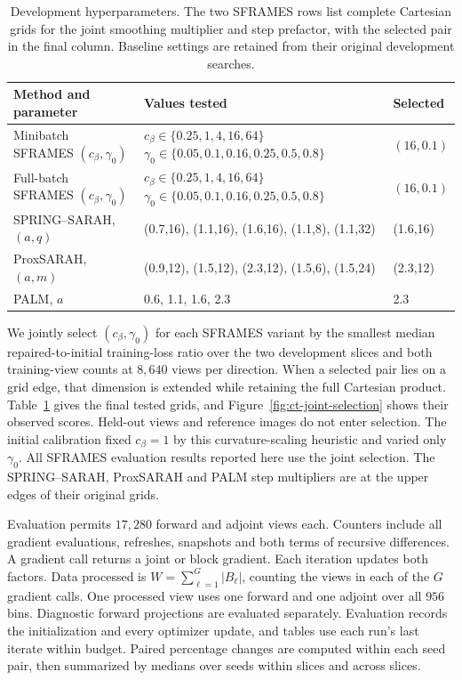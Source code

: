 \begin{table}[!htbp]
\centering
\caption{Development hyperparameters. The two SFRAMES rows list complete Cartesian grids for the joint smoothing multiplier and step prefactor, with the selected pair in the final column. Baseline settings are retained from their original development searches.}
\label{tab:ct-settings}
\small
\setlength{\tabcolsep}{4pt}
\begin{tabular}{@{}lll@{}}
\toprule
Method and parameter & Values tested & Selected \\
\midrule
\shortstack[l]{Minibatch SFRAMES\\ $(c_\beta,\gamma_0)$} & \shortstack[l]{$c_\beta\in\{0.25, 1, 4, 16, 64\}$\\ $\gamma_0\in\{0.05, 0.1, 0.16, 0.25, 0.5, 0.8\}$} & $(16,0.1)$ \\
\shortstack[l]{Full-batch SFRAMES\\ $(c_\beta,\gamma_0)$} & \shortstack[l]{$c_\beta\in\{0.25, 1, 4, 16, 64\}$\\ $\gamma_0\in\{0.05, 0.1, 0.16, 0.25, 0.5, 0.8\}$} & $(16,0.1)$ \\
SPRING--SARAH, $(a,q)$ & (0.7,16), (1.1,16), (1.6,16), (1.1,8), (1.1,32) & (1.6,16) \\
ProxSARAH, $(a,m)$ & (0.9,12), (1.5,12), (2.3,12), (1.5,6), (1.5,24) & (2.3,12) \\
PALM, $a$ & 0.6, 1.1, 1.6, 2.3 & 2.3 \\
\bottomrule
\end{tabular}
\end{table}
We jointly select \((c_\beta,\gamma_0)\) for each SFRAMES variant by the
smallest median repaired-to-initial training-loss ratio over the two
development slices and both training-view counts at
\(8{,}640\) views per direction.
When a selected pair lies on a grid edge, that dimension is extended while
retaining the full Cartesian product. Table~\ref{tab:ct-settings} gives the
final tested grids, and Figure~\ref{fig:ct-joint-selection} shows their
observed scores. Held-out views and reference images do not enter selection.
The initial calibration fixed \(c_\beta=1\) by this curvature-scaling
heuristic and varied only \(\gamma_0\). All SFRAMES evaluation results
reported here use the joint selection.
The SPRING--SARAH, ProxSARAH and PALM step multipliers are at the upper
edges of their original grids.

Evaluation permits \(17{,}280\)
forward and adjoint views each. Counters include all gradient evaluations,
refreshes, snapshots and both terms of recursive differences. A gradient call
returns a joint or block gradient. Each iteration updates both factors.
Data processed is \(W=\sum_{\ell=1}^G|B_\ell|\), counting the views in
each of the \(G\) gradient calls. One processed view uses one forward and
one adjoint over all \(956\) bins. Diagnostic forward projections are
evaluated separately. Evaluation records the initialization and every
optimizer update, and tables use each run's last iterate within budget.
Paired percentage changes are computed within each seed pair, then summarized
by medians over seeds within slices and across slices.

